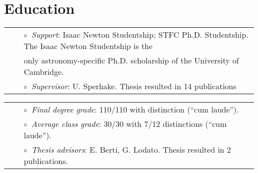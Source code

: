 \documentclass[a4paper]{moderncv}
\begin{document}
\section{Education}

\vspace{-0.1cm}
\begin{tabular}{rcl}
&\hspace{0.4cm} &$\circ\;\;${\textit{Support}}: Isaac Newton Studentship; STFC Ph.D. Studentship. The
Isaac Newton Studentship is the \\&\hspace{0.4cm} &  
\hspace{0.4cm}only astronomy-specific Ph.D. scholarship of the University of Cambridge.\\
&\hspace{0.4cm} &$\circ\;\;${\textit{Supervisor}}: U. Sperhake. Thesis resulted in 14 publications \\
\end{tabular}

\vspace{0.2cm}
\vspace{-0.1cm}
\begin{tabular}{rcl}
&\hspace{0.4cm} &$\circ\;\;${\textit{Final degree grade}}: 110/110 with distinction (``cum laude'').\\
&\hspace{0.4cm} &$\circ\;\;${\textit{Average class grade}}: 30/30 with 7/12 distinctions (``cum laude'').\\
&\hspace{0.4cm} &$\circ\;\;${\textit{Thesis advisors}}: E. Berti, G. Lodato. Thesis resulted in 2 publications.\\


\end{tabular}
\end{document}

